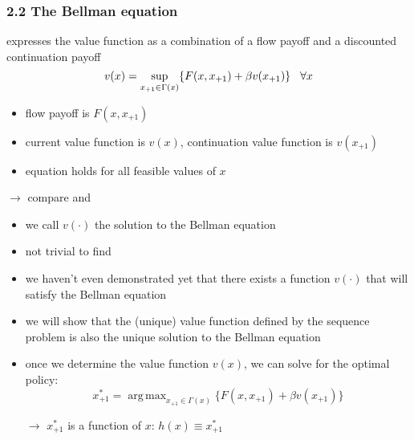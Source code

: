 \documentclass[compress,aspectratio=169]{beamer}
\DeclareMathOperator*{\argmax}{arg\,max}
\begin{document}
\begin{frame}
\frametitle{2.2 The Bellman equation}
{\textbf{\color{red!40!blue}{the Bellman equation}}} expresses the value function as a combination of a flow payoff and a discounted continuation payoff
\begin{displaymath}
v(x)=\sup_{x_{+1}\in \Gamma(x)} \{F(x,x_{+1})+\beta v(x_{+1}) \} \hspace{3 mm} \forall x
\end{displaymath}
\vspace{2 mm}
\begin{itemize}
\item flow payoff is $F(x,x_{+1})$
\vspace{2 mm}
\item current value function is $v(x)$, continuation value function is $v(x_{+1})$
\vspace{2 mm}
\item equation holds for all feasible values of $x$
\end{itemize}
\vspace{4 mm}
$\rightarrow$ compare {\color{red!40!yellow}{the sequence problem}} and {\color{red!40!blue}{the Bellman equation}}
\end{frame}

\begin{frame}
\begin{itemize}
\item we call $v(\cdot)$ the solution to the Bellman equation
\vspace{4 mm}
\item not trivial to find
\vspace{4 mm}
\item we haven't even demonstrated yet that there exists a function $v(\cdot)$ that will satisfy the Bellman equation
\vspace{4 mm}
\item we will show that the (unique) value function defined by the sequence problem is also the unique solution to the Bellman equation
\vspace{4 mm}
\item once we determine the value function $v(x)$, we can solve for the optimal policy:
\begin{displaymath}
x_{+1}^*=\argmax_{x_{+1}\in \Gamma(x)} \{F(x,x_{+1})+\beta v(x_{+1}) \}
\end{displaymath}
\item[$\rightarrow$] $x_{+1}^*$ is a function of $x$: $h(x) \equiv x_{+1}^*$
\end{itemize}
\end{frame}
\end{document}
